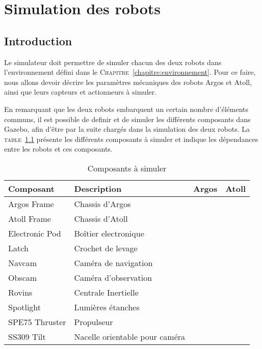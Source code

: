 \chapter{Simulation des robots}
	
	\section{Introduction}
		Le simulateur doit permettre de simuler chacun des deux robots dans l'environnement défini dans le \textsc{Chapitre}~\ref{chapitre:environnement}. Pour ce faire, nous allons devoir décrire les paramètres mécaniques des robots \gls{Argos} et \gls{Atoll}, ainsi que leurs capteurs et actionneurs à simuler.

		En remarquant que les deux robots embarquent un certain nombre d'éléments communs, il est possible de definir et de simuler les différents composants dans \gls{Gazebo}, afin d'être par la suite chargés dans la simulation des deux robots. La \textsc{table}~\ref{table:components} présente les différents composants à simuler et indique les dépendances entre les robots et ces composants.

		\begin{table}[!htb]
			\centering
			\begin{tabular}{|l|l|c|c|}
				\hline
				Composant & Description & \gls{Argos} & \gls{Atoll} \\
				\hline
				Argos Frame & Chassis d'\gls{Argos} & \cmark & \xmark \\
				\hline
				Atoll Frame & Chassis d'\gls{Atoll} & \xmark & \cmark \\
				\hline
				Electronic Pod & Boîtier electronique & \cmark & \cmark \\
				\hline
				Latch & Crochet de levage & \xmark & \cmark\\
				\hline
				\gls{Navcam} & Caméra de navigation & \cmark & \cmark\\
				\hline
				\gls{Obscam} & Caméra d'observation & \cmark & \cmark\\
				\hline
				Rovins & Centrale Inertielle & \cmark & \cmark\\
				\hline
				Spotlight & Lumières étanches & \cmark & \cmark \\
				\hline
				SPE75 Thruster & Propulseur & \cmark & \cmark \\
				\hline
				SS309 Tilt & Nacelle orientable pour caméra & \cmark & \cmark \\
				\hline
			\end{tabular}
			\caption{Composants à simuler}
			\label{table:components}
		\end{table}

